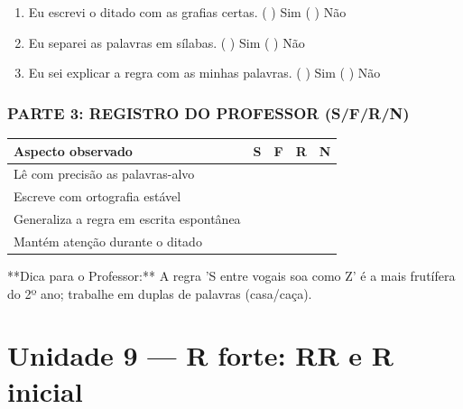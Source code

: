 \begin{exercicio}
\begin{enumerate}[label=\alph*)]
  \item Eu escrevi o ditado com as grafias certas.  \quad ( ) Sim   ( ) Não

  \item Eu separei as palavras em sílabas.  \quad ( ) Sim   ( ) Não

  \item Eu sei explicar a regra com as minhas palavras.  \quad ( ) Sim   ( ) Não

\end{enumerate}

\subsection*{PARTE 3: REGISTRO DO PROFESSOR (S/F/R/N)}

\begin{center}
\renewcommand{\arraystretch}{1.4}
\begin{tabular}{@{}p{9cm}cccc@{}}
\toprule
Aspecto observado & S & F & R & N \\
\midrule
Lê com precisão as palavras-alvo & & & & \\
Escreve com ortografia estável & & & & \\
Generaliza a regra em escrita espontânea & & & & \\
Mantém atenção durante o ditado & & & & \\
\bottomrule\end{tabular}\end{center}

\end{exercicio}

\begin{dica}
**Dica para o Professor:** A regra 'S entre vogais soa como Z' é a mais frutífera do 2º ano; trabalhe em duplas de palavras (casa/caça).
\end{dica}


\chapter{Unidade 9 --- R forte: RR e R inicial}


